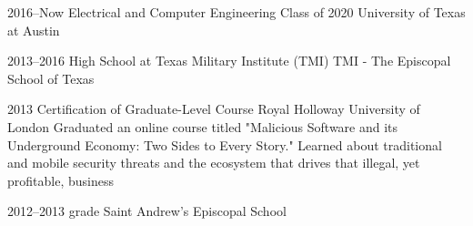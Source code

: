 \documentclass[]{friggeri-cv} %
\begin{document}
\begin{entrylist}

	\vspace{-10pt}
	\entry
	{2016--Now}
	{Electrical and Computer Engineering Class of 2020}
	{University of Texas at Austin}


	\vspace{-10pt}
	\entry
	{2013--2016}
	{High School at Texas Military Institute (TMI)}
	{TMI - The Episcopal School of Texas}


	\entry
	{2013}
	{Certification of Graduate-Level Course}
	{Royal Holloway University of London}
	{Graduated an online course titled "Malicious Software and its Underground Economy: Two Sides to Every Story." Learned about traditional and mobile security threats and the ecosystem that drives that illegal, yet profitable, business}


	\vspace{-10pt}
	\entry
	{2012--2013}
	{ grade}
	{Saint Andrew's Episcopal School}

\end{entrylist}

\vspace{-20pt}
\end{document}
